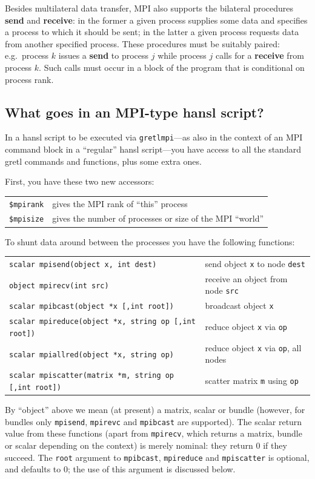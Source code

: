\documentclass{article}
\begin{document}
Besides multilateral data transfer, MPI also supports the bilateral
procedures \textbf{send} and \textbf{receive}: in the former a given
process supplies some data and specifies a process to which it should
be sent; in the latter a given process requests data from another
specified process. These procedures must be suitably paired: e.g.\
process $k$ issues a \textbf{send} to process $j$ while process $j$
calls for a \textbf{receive} from process $k$. Such calls must occur
in a block of the program that is conditional on process rank.


\subsection{What goes in an MPI-type hansl script?}
\label{subsec:script}

In a hansl script to be executed via \texttt{gretlmpi}---as also
in the context of an MPI command block in a ``regular'' hansl
script---you have access to all the standard gretl commands and
functions, plus some extra ones.

First, you have these two new accessors:
\begin{center}
\begin{tabular}{ll}
\texttt{\$mpirank} & gives the MPI rank of ``this'' process \\
\texttt{\$mpisize} & gives the number of processes or size of the MPI ``world''
\end{tabular}
\end{center}

To shunt data around between the processes you have the following
functions:
\begin{center}
\begin{tabular}{ll}
\texttt{scalar mpisend(object x, int dest)} & 
  send object \texttt{x} to node \texttt{dest}\\
\texttt{object mpirecv(int src)} & 
  receive an object from node \texttt{src} \\
\texttt{scalar mpibcast(object *x [,int root])} & 
  broadcast object \texttt{x} \\
\texttt{scalar mpireduce(object *x, string op [,int root])} & 
  reduce object \texttt{x} via \texttt{op} \\
\texttt{scalar mpiallred(object *x, string op)} & 
  reduce object \texttt{x} via \texttt{op}, all nodes \\
\texttt{scalar mpiscatter(matrix *m, string op [,int root])} & 
  scatter matrix \texttt{m} using \texttt{op} \\
\end{tabular}
\end{center}
By ``object'' above we mean (at present) a matrix, scalar or bundle
(however, for bundles only \texttt{mpisend}, \texttt{mpirevc} and
\texttt{mpibcast} are supported).  The scalar return value from these
functions (apart from \texttt{mpirecv}, which returns a matrix, bundle
or scalar depending on the context) is merely nominal: they return 0
if they succeed. The \texttt{root} argument to \texttt{mpibcast},
\texttt{mpireduce} and \texttt{mpiscatter} is optional, and defaults
to 0; the use of this argument is discussed below.
\end{document}
